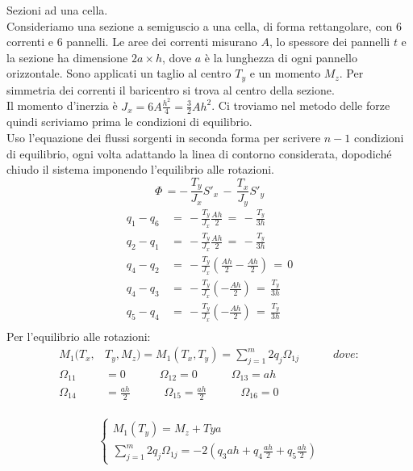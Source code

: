 \begin{esempioBox}
    Sezioni ad una cella.\\
    Consideriamo una sezione a semiguscio a una cella, di forma rettangolare, con 6 correnti e 6 pannelli. Le aree dei correnti misurano $A$, lo spessore dei pannelli $t$ e la sezione ha dimensione $2a\times h$, dove $a$ è la lunghezza di ogni pannello orizzontale. Sono applicati un taglio al centro $T_y$ e un momento $M_z$. Per simmetria dei correnti il baricentro si trova al centro della sezione.\\
    Il momento d'inerzia è $J_x=6A\frac{h^2}{4}=\frac{3}{2}Ah^2$. Ci troviamo nel metodo delle forze quindi scriviamo prima le condizioni di equilibrio. \\
    Uso l'equazione dei flussi sorgenti in seconda forma per scrivere $n-1$ condizioni di equilibrio, ogni volta adattando la linea di contorno considerata, dopodiché chiudo il sistema imponendo l'equilibrio alle rotazioni.
    \begin{equation*}
       \Phi\, = -\, \frac{T_y}{J_x}S'_x  \,-\, \frac{T_x}{J_y}S'_y 
    \end{equation*}
    \begin{align*}
        q_1-q_6 \,&=\, -\frac{T_y}{J_x}\frac{Ah}{2}\,=\, - \frac{T_y}{3h}\\
         q_2-q_1 \,&=\, -\frac{T_y}{J_x}\frac{Ah}{2}\,=\, - \frac{T_y}{3h}\\
          q_4-q_2 \,&=\, -\frac{T_y}{J_x}\left(\frac{Ah}{2}-\frac{Ah}{2}\right)\,=\, 0\\
           q_4-q_3 \,&=\, -\frac{T_y}{J_x}\left(-\frac{Ah}{2}\right)\,=\,  \frac{T_y}{3h}\\
            q_5-q_4 \,&=\, -\frac{T_y}{J_x}\left(-\frac{Ah}{2}\right)\,=\,  \frac{T_y}{3h}\\
    \end{align*}
    Per l'equilibrio alle rotazioni:
    \begin{align*}
    M_1 (T_x, &T_y, M_z)=  M_1 (T_x, T_y) = \sum^m_{j=1}2q_j\Omega_{1j} \quad\quad\quad dove:\\
    \Omega_{11}&=0 \quad\quad\quad \Omega_{12}=0 \quad\quad\quad \Omega_{13}=ah \quad\quad\quad   \\
     \Omega_{14}&=\frac{ah}{2} \quad\quad\quad \Omega_{15}=\frac{ah}{2} \quad\quad\quad \Omega_{16}=0 \quad\quad\quad    \\
\end{align*}

\begin{equation*}
    \begin{cases}
        M_1(T_y)=M_z+Tya\\
    \sum^m_{j=1}2q_j\Omega_{1j} = -2(q_3ah+q_4\frac{ah}{2}+q_5\frac{ah}{2})
    \end{cases}
\end{equation*}


\end{esempioBox}
